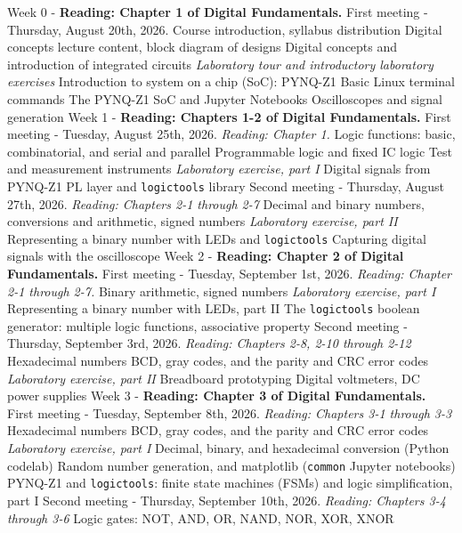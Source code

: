 \documentclass[10pt]{article}
\begin{document}
\begin{outline}[enumerate]
\1 Week 0 - \textbf{Reading: Chapter 1 of Digital Fundamentals.}
\2 First meeting - Thursday, August 20th, 2026.
\3 Course introduction, syllabus distribution
\3 Digital concepts lecture content, block diagram of designs
\3 Digital concepts and introduction of integrated circuits
\3 \textit{Laboratory tour and introductory laboratory exercises}
\4 Introduction to system on a chip (SoC): PYNQ-Z1
\4 Basic Linux terminal commands
\4 The PYNQ-Z1 SoC and Jupyter Notebooks
\4 Oscilloscopes and signal generation
\1 Week 1 - \textbf{Reading: Chapters 1-2 of Digital Fundamentals.}
\2 First meeting - Tuesday, August 25th, 2026. \textit{Reading: Chapter 1.}
\3 Logic functions: basic, combinatorial, and serial and parallel
\3 Programmable logic and fixed IC logic
\3 Test and measurement instruments
\3 \textit{Laboratory exercise, part I}
\4 Digital signals from PYNQ-Z1
\4 PL layer and \verb+logictools+ library
\2 Second meeting - Thursday, August 27th, 2026. \textit{Reading: Chapters 2-1 through 2-7}
\3 Decimal and binary numbers, conversions and arithmetic, signed numbers
\3 \textit{Laboratory exercise, part II}
\4 Representing a binary number with LEDs and \verb+logictools+
\4 Capturing digital signals with the oscilloscope
\1 Week 2 - \textbf{Reading: Chapter 2 of Digital Fundamentals.}
\2 First meeting - Tuesday, September 1st, 2026. \textit{Reading: Chapter 2-1 through 2-7.}
\3 Binary arithmetic, signed numbers
\3 \textit{Laboratory exercise, part I}
\4 Representing a binary number with LEDs, part II
\4 The \verb+logictools+ boolean generator: multiple logic functions, associative property
\2 Second meeting - Thursday, September 3rd, 2026. \textit{Reading: Chapters 2-8, 2-10 through 2-12}
\3 Hexadecimal numbers
\3 BCD, gray codes, and the parity and CRC error codes
\3 \textit{Laboratory exercise, part II}
\4 Breadboard prototyping
\4 Digital voltmeters, DC power supplies
\1 Week 3 - \textbf{Reading: Chapter 3 of Digital Fundamentals.}
\2 First meeting - Tuesday, September 8th, 2026. \textit{Reading: Chapters 3-1 through 3-3}
\3 Hexadecimal numbers
\3 BCD, gray codes, and the parity and CRC error codes
\3 \textit{Laboratory exercise, part I}
\4 Decimal, binary, and hexadecimal conversion (Python codelab)
\4 Random number generation, and matplotlib (\verb+common+ Jupyter notebooks)
\4 PYNQ-Z1 and \verb+logictools+: finite state machines (FSMs) and logic simplification, part I
\2 Second meeting - Thursday, September 10th, 2026. \textit{Reading: Chapters 3-4 through 3-6}
\3 Logic gates: NOT, AND, OR, NAND, NOR, XOR, XNOR

\end{outline}
\end{document}
